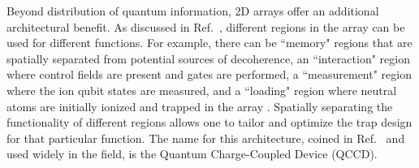 \documentclass[%
12pt,
 amsmath,amssymb,
]{revtex4-2}
\begin{document}
Beyond distribution of quantum information, 2D arrays offer an additional architectural benefit. As discussed in Ref.~\cite{KielpinskiQCArchitecture2002}, different regions in the array can be used for different functions.  For example, there can be ``memory" regions that are spatially separated from potential sources of decoherence, an ``interaction" region where control fields are present and gates are performed, a ``measurement" region where the ion qubit states are measured, and a ``loading" region where neutral atoms are initially ionized and trapped in the array \cite{LekitscheMicrowaveBlueprint2017}.  Spatially separating the functionality of different regions allows one to tailor and optimize the trap design for that particular function. The name for this architecture, coined in Ref.~\cite{KielpinskiQCArchitecture2002} and used widely in the field, is the Quantum Charge-Coupled Device (QCCD).
\end{document}
